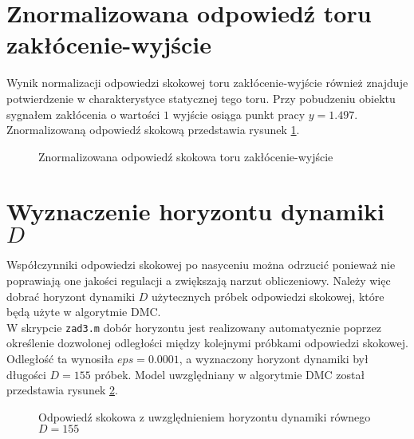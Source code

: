 \section{Znormalizowana odpowiedź toru zakłócenie-wyjście}
Wynik normalizacji odpowiedzi skokowej toru zakłócenie-wyjście również znajduje potwierdzenie w charakterystyce statycznej tego toru. Przy pobudzeniu obiektu sygnałem zakłócenia o wartości $\num{1}$ wyjście osiąga punkt pracy $y = \num{1,497}$. Znormalizowaną odpowiedź skokową przedstawia rysunek \ref{zad3_norm_odp_d}.

\begin{figure}[b]
    \centering
    \caption{Znormalizowana odpowiedź skokowa toru zakłócenie-wyjście}
    \label{zad3_norm_odp_d}
\end{figure}
\FloatBarrier

\section{Wyznaczenie horyzontu dynamiki $D$}
\label{zad3_wyznacznie_D}
Współczynniki odpowiedzi skokowej po nasyceniu można odrzucić ponieważ nie poprawiają one jakości regulacji a zwiększają narzut obliczeniowy. Należy więc dobrać horyzont dynamiki $D$ użytecznych próbek odpowiedzi skokowej, które będą użyte w algorytmie DMC.\\
\indent{} W skrypcie \verb+zad3.m+ dobór horyzontu jest realizowany automatycznie poprzez określenie dozwolonej odległości między kolejnymi próbkami odpowiedzi skokowej. Odległość ta wynosiła $eps = \num{0,0001}$, a wyznaczony horyzont dynamiki był długości $D = \num{155}$ próbek. Model uwzględniany w algorytmie DMC został przedstawia rysunek \ref{zad3_cut_resp}.

\begin{figure}[b]
    \centering
    \caption{Odpowiedź skokowa z uwzględnieniem horyzontu dynamiki równego $D = 155$}
    \label{zad3_cut_resp}
\end{figure}


